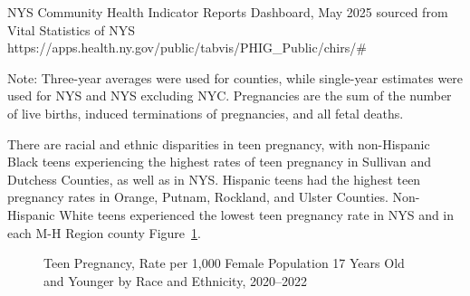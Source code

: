 \documentclass[
  english,
  letterpaper,
]{report}
\begin{document}
\begin{tcolorbox}[enhanced jigsaw, breakable, leftrule=.75mm, title=\textcolor{quarto-callout-note-color}{\faInfo}\hspace{0.5em}{Source}, bottomrule=.15mm, opacityback=0, left=2mm, colback=white, bottomtitle=1mm, coltitle=black, colbacktitle=quarto-callout-note-color!10!white, colframe=quarto-callout-note-color-frame, opacitybacktitle=0.6, toptitle=1mm, titlerule=0mm, arc=.35mm, rightrule=.15mm, toprule=.15mm]

NYS Community Health Indicator Reports Dashboard, May 2025 sourced from
Vital Statistics of NYS
https://apps.health.ny.gov/public/tabvis/PHIG\_Public/chirs/\#

\end{tcolorbox}

\begin{tcolorbox}[enhanced jigsaw, breakable, leftrule=.75mm, title=\textcolor{quarto-callout-note-color}{\faInfo}\hspace{0.5em}{Note}, bottomrule=.15mm, opacityback=0, left=2mm, colback=white, bottomtitle=1mm, coltitle=black, colbacktitle=quarto-callout-note-color!10!white, colframe=quarto-callout-note-color-frame, opacitybacktitle=0.6, toptitle=1mm, titlerule=0mm, arc=.35mm, rightrule=.15mm, toprule=.15mm]

Note: Three-year averages were used for counties, while single-year
estimates were used for NYS and NYS excluding NYC. Pregnancies are the
sum of the number of live births, induced terminations of pregnancies,
and all fetal deaths.

\end{tcolorbox}

There are racial and ethnic disparities in teen pregnancy, with
non-Hispanic Black teens experiencing the highest rates of teen
pregnancy in Sullivan and Dutchess Counties, as well as in NYS. Hispanic
teens had the highest teen pregnancy rates in Orange, Putnam, Rockland,
and Ulster Counties. Non-Hispanic White teens experienced the lowest
teen pregnancy rate in NYS and in each M-H Region county
Figure~\ref{fig-17-teenpreg-rande-rate}.

\begin{figure}


\caption{\label{fig-17-teenpreg-rande-rate}Teen Pregnancy, Rate per
1,000 Female Population 17 Years Old and Younger by Race and Ethnicity,
2020--2022}

\end{figure}%
\end{document}
